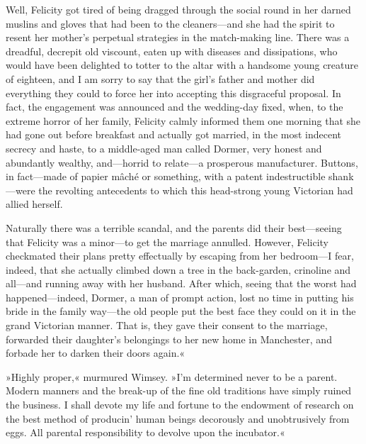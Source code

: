 Well, Felicity got tired of being dragged through the social round in her darned muslins and gloves that had been to the cleaners—and she had the spirit to resent her mother's perpetual strategies in the match-making line. There was a dreadful, decrepit old viscount, eaten up with diseases and dissipations, who would have been delighted to totter to the altar with a handsome young creature of eighteen, and I am sorry to say that the girl's father and mother did everything they could to force her into accepting this disgraceful proposal. In fact, the engagement was announced and the wedding-day fixed, when, to the extreme horror of her family, Felicity calmly informed them one morning that she had gone out before breakfast and actually got married, in the most indecent secrecy and haste, to a middle-aged man called Dormer, very honest and abundantly wealthy, and—horrid to relate—a prosperous manufacturer. Buttons, in fact—made of papier mâché or something, with a patent indestructible shank—were the revolting antecedents to which this head-strong young Victorian had allied herself.

Naturally there was a terrible scandal, and the parents did their best—seeing that Felicity was a minor—to get the marriage annulled. However, Felicity checkmated their plans pretty effectually by escaping from her bedroom—I fear, indeed, that she actually climbed down a tree in the back-garden, crinoline and all—and running away with her husband. After which, seeing that the worst had happened—indeed, Dormer, a man of prompt action, lost no time in putting his bride in the family way—the old people put the best face they could on it in the grand Victorian manner. That is, they gave their consent to the marriage, forwarded their daughter's belongings to her new home in Manchester, and forbade her to darken their doors again.«

»Highly proper,« murmured Wimsey. »I'm determined never to be a parent. Modern manners and the break-up of the fine old traditions have simply ruined the business. I shall devote my life and fortune to the endowment of research on the best method of producin' human beings decorously and unobtrusively from eggs. All parental responsibility to devolve upon the incubator.«

